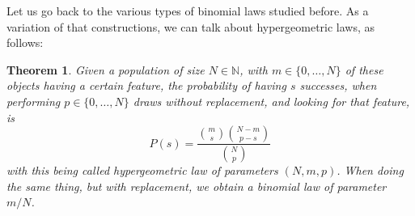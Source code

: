 \documentclass[12pt]{amsbook}
\newtheorem{theorem}{Theorem}[chapter]
\begin{document}
Let us go back to the various types of binomial laws studied before. As a variation of that constructions, we can talk about hypergeometric laws, as follows:


\begin{theorem}
Given a population of size $N\in\mathbb N$, with $m\in\{0,\ldots,N\}$ of these objects having a certain feature, the probability of having $s$ successes, when performing $p\in\{0,\ldots,N\}$ draws without replacement, and looking for that feature, is
$$P(s)=\frac{\binom{m}{s}\binom{N-m}{p-s}}{\binom{N}{p}}$$
with this being called hypergeometric law of parameters $(N,m,p)$. When doing the same thing, but with replacement, we obtain a binomial law of parameter $m/N$.
\end{theorem}
\end{document}
